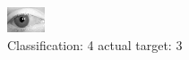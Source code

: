 \begin{figure}[h!]
\begin{center}
\includegraphics[width=0.60\columnwidth]{figures/ID2831_class_4_target_3.png}
\end{center}
\caption{ Classification: 4 actual target: 3}
\label{fig:ID2831_class_4_target_3}
\end{figure}
